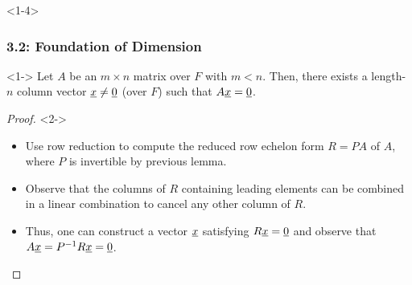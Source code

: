 \documentclass[10pt,english,aspectratio=169]{beamer}
\begin{document}
\begin{frame}<1-4> \frametitle{3.2: Foundation of Dimension}

\begin{lemma}<1->
Let $A$ be an $m \times n$ matrix over $F$ with $m<n$.
Then, there exists a length-$n$ column vector $\underline{x} \neq \underline{0}$ (over $F$) such that $A \underline{x} = \underline{0}$.
\end{lemma}

\begin{proof}<2->
\begin{itemize}
\item<2-> Use row reduction to compute the reduced row echelon form $R=PA$ of $A$, where $P$ is invertible by previous lemma.

\item<3-> Observe that the columns of $R$ containing leading elements can be combined in a linear combination to cancel any other column of $R$.

\item<4-> Thus, one can construct a vector $\underline{x}$ satisfying $R\underline{x}=\underline{0}$ and observe that $A \underline{x} = P^{-1} R \underline{x} = \underline{0}$. \hfill \qedhere
\end{itemize}
\end{proof}

\vspace{2mm}




\end{frame}
\end{document}
